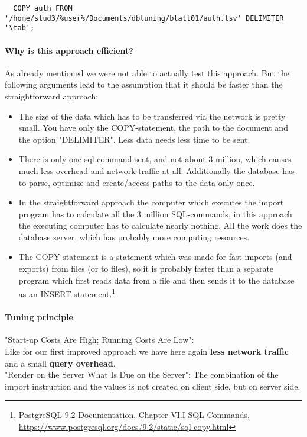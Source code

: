 \documentclass[11pt]{scrartcl}
\begin{document}
{\small
\begin{verbatim}
  COPY auth FROM '/home/stud3/%user%/Documents/dbtuning/blatt01/auth.tsv' DELIMITER '\tab';
\end{verbatim}
}

\paragraph{Why is this approach efficient?}

As already mentioned we were not able to actually test this approach. But the following arguments lead to the assumption that it should be faster than the straightforward approach:
\begin{itemize}
\item The size of the data which has to be transferred via the network is pretty small. You have only the COPY-statement, the path to the document and the option "DELIMITER". Less data needs less time to be sent.
\item There is only one sql command sent, and not about 3 million, which causes much less overhead and network traffic at all. Additionally the database has to parse, optimize and create/access paths to the data only once.
\item In the straightforward approach the computer which executes the import program has to calculate all the 3 million SQL-commands, in this approach the executing computer has to calculate nearly nothing. All the work does the database server, which has probably more computing resources.
\item The COPY-statement is a statement which was made for fast imports (and exports) from files (or to files), so it is probably faster than a separate program which first reads data from a file and then sends it to the database as an INSERT-statement.\footnote{PostgreSQL 9.2
  Documentation, Chapter VI.I SQL Commands,
  \url{https://www.postgresql.org/docs/9.2/static/sql-copy.html}}
\end{itemize}



\paragraph{Tuning principle}
"Start-up Costs Are High; Running Costs Are Low":
\\
Like for our first improved approach we have here again \textbf{less network traffic} and a small \textbf{query overhead}.
\\
"Render on the Server What Is Due on the Server":
The combination of the import instruction and the values is not created on client side, but on server side.
\end{document}
